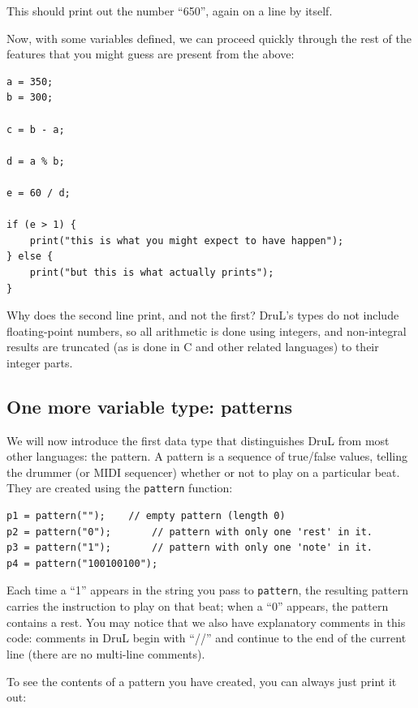 This should print out the number ``650'', again on a line by itself.

Now, with some variables defined, we can proceed quickly through the rest of the features that 
you might guess are present from the above:


\begin{lstlisting}
a = 350;
b = 300;

c = b - a;

d = a % b;

e = 60 / d;

if (e > 1) {
	print("this is what you might expect to have happen");
} else {
	print("but this is what actually prints");
}

\end{lstlisting}

Why does the second line print, and not the first?  DruL's types do not include floating-point numbers, so all arithmetic is done using integers, and non-integral results are truncated (as is done in C and other related languages) to their integer parts.

\subsection{One more variable type: patterns}

We will now introduce the first data type that distinguishes DruL from most other languages: the pattern.  A pattern is a sequence of true/false values, telling the drummer (or MIDI sequencer) whether or not to play on a particular beat.  They are created using the {\tt pattern} function:

\begin{lstlisting}
p1 = pattern("");	 // empty pattern (length 0)
p2 = pattern("0");       // pattern with only one 'rest' in it.
p3 = pattern("1");       // pattern with only one 'note' in it.
p4 = pattern("100100100");
\end{lstlisting}

Each time a ``1'' appears in the string you pass to {\tt pattern}, the resulting pattern carries the instruction to play on that beat; when a ``0'' appears, the pattern contains a rest.
You may notice that we also have explanatory comments in this code: comments in DruL begin with ``//'' and continue to the end of the current line (there are no multi-line comments). 

To see the contents of a pattern you have created, you can always just print it out:

